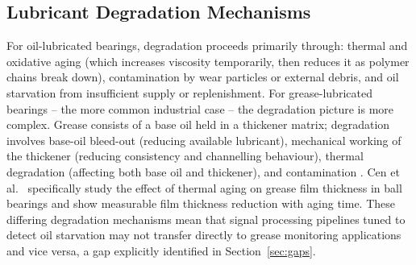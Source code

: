 \subsection{Lubricant Degradation Mechanisms}
\label{subsec:degradation}
For oil-lubricated bearings, degradation proceeds primarily through: thermal and oxidative aging (which increases viscosity temporarily, then reduces it as polymer chains break down), contamination by wear particles or external debris, and oil starvation from insufficient supply or replenishment. For grease-lubricated bearings -- the more common industrial case -- the degradation picture is more complex. Grease consists of a base oil held in a thickener matrix; degradation involves base-oil bleed-out (reducing available lubricant), mechanical working of the thickener (reducing consistency and channelling behaviour), thermal degradation (affecting both base oil and thickener), and contamination \cite{lugt_grease_2012,sahu_grease_2022,zhang_grease_2021}. Cen et al.\ \cite{cen_effect_2025} specifically study the effect of thermal aging on grease film thickness in ball bearings and show measurable film thickness reduction with aging time. These differing degradation mechanisms mean that signal processing pipelines tuned to detect oil starvation may not transfer directly to grease monitoring applications and vice versa, a gap explicitly identified in Section~\ref{sec:gaps}.
